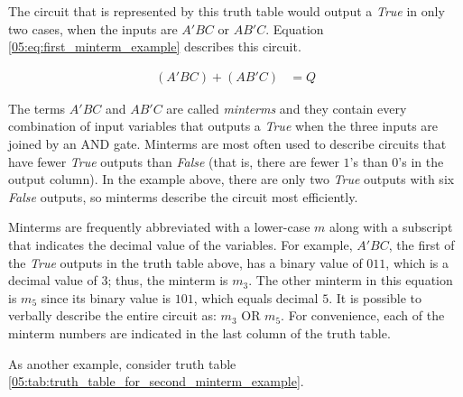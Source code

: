 The circuit that is represented by this truth table would output a \emph{True} in only two cases, when the inputs are $ A'BC $ or $ AB'C $. Equation \ref{05:eq:first_minterm_example} describes this circuit.

\begin{align}
  \label{05:eq:first_minterm_example}
  (A'BC)+(AB'C) &= Q
\end{align}

The terms $ A'BC $ and $ AB'C $ are called \emph{minterms} and they contain every combination of input variables that outputs a \emph{True} when the three inputs are joined by an \textsf{AND} gate. Minterms are most often used to describe circuits that have fewer \emph{True} outputs than \emph{False} (that is, there are fewer $ 1 $'s than $ 0 $'s in the output column). In the example above, there are only two \emph{True} outputs with six \emph{False} outputs, so minterms describe the circuit most efficiently. 

Minterms are frequently abbreviated with a lower-case  $ m $ along with a subscript that indicates the decimal value of the variables. For example, $ A'BC $, the first of the \emph{True} outputs in the truth table above, has a binary value of $ 011 $, which is a decimal value of $ 3 $; thus, the minterm is $ m_3 $. The other minterm in this equation is $ m_5 $ since its binary value is $ 101 $, which equals decimal $ 5 $. It is possible to verbally describe the entire circuit as: $ m_3 $ \textsf{OR} $ m_5 $. For convenience, each of the minterm numbers are indicated in the last column of the truth table.

As another example, consider truth table \ref{05:tab:truth_table_for_second_minterm_example}.

